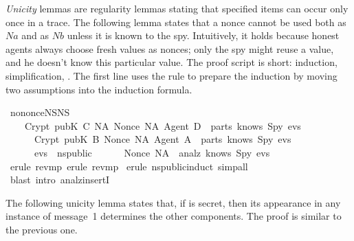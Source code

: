 \begin{isabellebody}
\begin{isamarkuptext}
\emph{Unicity} lemmas are regularity lemmas stating that specified items
can occur only once in a trace.  The following lemma states that a nonce
cannot be used both as $Na$ and as $Nb$ unless
it is known to the spy.  Intuitively, it holds because honest agents
always choose fresh values as nonces; only the spy might reuse a value,
and he doesn't know this particular value.  The proof script is short:
induction, simplification, .  The first line uses the rule
 to prepare the induction by moving two assumptions into the 
induction formula.%
\end{isamarkuptext}%
\isamarkuptrue%
\isamarkupfalse%
\ no{\isacharunderscore}nonce{\isacharunderscore}NS{}{\isacharunderscore}NS{}{\isacharcolon}\isanewline
\ \ \ \ {\isachardoublequoteopen}{\isasymlbrakk}Crypt\ {\isacharparenleft}pubK\ C{\isacharparenright}\ {\isasymlbrace}NA{\isacharprime}{\isacharcomma}\ Nonce\ NA{\isacharcomma}\ Agent\ D{\isasymrbrace}\ {\isasymin}\ parts\ {\isacharparenleft}knows\ Spy\ evs{\isacharparenright}{\isacharsemicolon}\isanewline
\ \ \ \ \ \ Crypt\ {\isacharparenleft}pubK\ B{\isacharparenright}\ {\isasymlbrace}Nonce\ NA{\isacharcomma}\ Agent\ A{\isasymrbrace}\ {\isasymin}\ parts\ {\isacharparenleft}knows\ Spy\ evs{\isacharparenright}{\isacharsemicolon}\isanewline
\ \ \ \ \ \ evs\ {\isasymin}\ ns{\isacharunderscore}public{\isasymrbrakk}\isanewline
\ \ \ \ \ {\isasymLongrightarrow}\ Nonce\ NA\ {\isasymin}\ analz\ {\isacharparenleft}knows\ Spy\ evs{\isacharparenright}{\isachardoublequoteclose}\isanewline
%
\isadelimproof
%
\endisadelimproof
%
\isatagproof
{}\isamarkupfalse%
\ {\isacharparenleft}erule\ rev{\isacharunderscore}mp{\isacharcomma}\ erule\ rev{\isacharunderscore}mp{\isacharparenright}\isanewline
{}\isamarkupfalse%
\ {\isacharparenleft}erule\ ns{\isacharunderscore}public{\isachardot}induct{\isacharcomma}\ simp{\isacharunderscore}all{\isacharparenright}\isanewline
{}\isamarkupfalse%
\ {\isacharparenleft}blast\ intro{\isacharcolon}\ analz{\isacharunderscore}insertI{\isacharparenright}{\isacharplus}\isanewline
{}\isamarkupfalse%
%
\endisatagproof
{\isafoldproof}%
%
\isadelimproof
%
\endisadelimproof
%
\begin{isamarkuptext}%
The following unicity lemma states that, if  is secret, then its
appearance in any instance of message~1 determines the other components. 
The proof is similar to the previous one.%
\end{isamarkuptext}%

\end{isabellebody}
